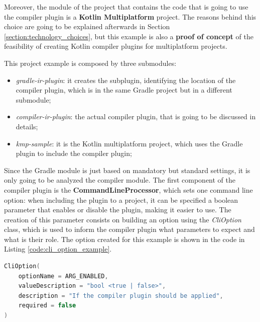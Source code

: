 Moreover, the module of the project that contains the code that is going to use the compiler plugin is a \textbf{Kotlin Multiplatform} project. The reasons behind this choice are going to be explained afterwards in Section \ref{section:technology_choices}, but this example is also a \textbf{proof of concept} of the feasibility of creating Kotlin compiler plugins for multiplatform projects.

This project example is composed by three submodules:
\begin{itemize}
    \item \textit{gradle-ir-plugin}: it creates the subplugin, identifying the location of the compiler plugin, which is in the same Gradle project but in a different submodule;
    \item \textit{compiler-ir-plugin}: the actual compiler plugin, that is going to be discussed in details;
    \item \textit{kmp-sample}: it is the Kotlin multiplatform project, which uses the Gradle plugin to include the compiler plugin;
\end{itemize}

Since the Gradle module is just based on mandatory  but standard settings, it is only going to be analyzed the compiler module.\newline
The first component of the compiler plugin is the \textbf{CommandLineProcessor}, which sets one command line option: when including the plugin to a project, it can be specified a boolean parameter that enables or disable the plugin, making it easier to use.\newline
The creation of this parameter consists on building an option using the \textit{CliOption} class, which is used to inform the compiler plugin what parameters to expect and what is their role. The option created for this example is shown in the code in Listing \ref{code:cli_option_example}.
\begin{lstlisting}[caption={Creation of compiler option that enables or disables the plugin}, captionpos=b, language=Kotlin, label={code:cli_option_example}]
CliOption(
    optionName = ARG_ENABLED,
    valueDescription = "bool <true | false>",
    description = "If the compiler plugin should be applied",
    required = false
)
\end{lstlisting}

